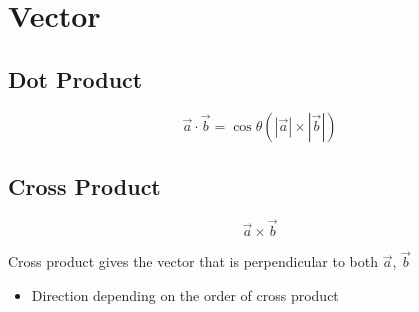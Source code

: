 \chapter{Vector}

\section{Dot Product}

  \begin{equation}
    \vec{a} \cdot \vec{b} = \cos \theta
    \left( \left| \vec{a} \right| \times \left| \vec{b} \right| \right)
  \end{equation}

\section{Cross Product}

  \begin{equation}
    \vec{a} \times \vec{b}
  \end{equation}

  Cross product gives the vector that is perpendicular to both $ \vec{a} $,
  $ \vec{b} $

  \begin{itemize}
    \item Direction depending on the order of cross product
  \end{itemize}
